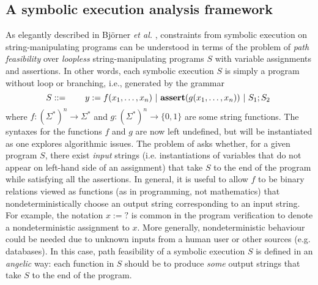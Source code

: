 \subsection{A symbolic execution analysis framework} \label{subsec:symexe} 
As elegantly described in Bj\"{o}rner \emph{et al.} \cite{BTV09}, constraints 
from symbolic 
execution on string-manipulating programs can be understood in terms of the
problem of \emph{path 
feasibility} over \emph{loopless} string-manipulating programs $S$ with variable
assignments and assertions. 
In other words, each symbolic execution $S$ is simply a program 
without loop or branching, i.e., generated by the grammar
\begin{equation*}
    S ::= \qquad y := f(x_1,\ldots,x_n) \ |\ \text{\ASSERT{$g(x_1,\ldots,x_n)$}}\ |\ 
            S_1; S_2\ 
\end{equation*}
where $f: (\Sigma^*)^n \to \Sigma^*$ and $g: (\Sigma^*)^n \to \{0,1\}$ are
some string functions. 
The syntaxes for the functions $f$ and $g$ are now
left undefined, but will be instantiated as one explores algorithmic issues.
The problem of \defn{path feasibility}
asks whether, for a given program $S$, there exist \emph{input} strings (i.e. 
instantiations of variables that do not appear on left-hand side of an 
assignment) that take
$S$ to the end of the program while satisfying all the assertions. 
In general, it is useful to allow $f$ to be %
binary relations viewed as functions (as in programming, not mathematics) that 
nondeterministically choose an output string corresponding to an input string. 
For example, the 
notation $x := ?$ is common in the program verification to 
denote a nondeterministic assignment to $x$. More generally, nondeterministic
behaviour could be needed due to unknown inputs from a human user or other 
sources (e.g. databases). In this case, path feasibility of a
symbolic execution $S$
is defined in an \emph{angelic} way: each function in $S$
should be to produce \emph{some} output strings that take $S$ to the end of the
program.


